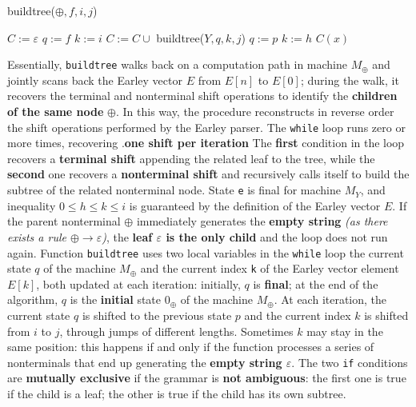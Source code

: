 \begin{algorithm}[H]
  \caption{buildtree($\oplus, f, i, j$)}
      \begin{algorithmic}[1]
          \State $C := \varepsilon$
          \State $q := f$
          \State $k := i$
              \EndIf 
                  \State $C := C \cup$ buildtree($Y, q, k, j$)
              \EndIf 
              \State $q := p$ 
              \State $k := h $
          \EndWhile
          \State \Return $C(x)$
      \end{algorithmic}
\end{algorithm}
Essentially, \texttt{buildtree} walks back on a computation path in machine $M_\oplus$ and jointly scans back the Earley vector $E$ from $E[n]$ to $E[0]$;
during the walk, it recovers the terminal and nonterminal shift operations to identify the \textbf{children of the same node} $\oplus$.
In this way, the procedure reconstructs in reverse order the shift operations performed by the Earley parser.
The \texttt{while} loop runs zero or more times, recovering .\textbf{one shift per iteration}
The \textbf{first} condition in the loop recovers a \textbf{terminal shift} appending the related leaf to the tree, while the \textbf{second} one recovers a \textbf{nonterminal shift} and recursively calls itself to build the subtree of the related nonterminal node.
State \texttt{e} is final for machine $M_Y$, and inequality $0 \leq h \leq k \leq i$ is guaranteed by the definition of the Earley vector $E$.
If the parent nonterminal $\oplus$ immediately generates the \textbf{empty string} \textit{(as there exists a rule $\oplus \rightarrow \varepsilon$)}, the \textbf{leaf $\varepsilon$ is the only child} and the loop does not run again.
Function \texttt{buildtree} uses two local variables in the \texttt{while} loop the current state $q$ of the machine $M_\oplus$ and the current index \texttt{k} of the Earley vector element $E[k]$, both updated at each iteration:
initially, $q$ is \textbf{final}; at the end of the algorithm, $q$ is the \textbf{initial} state $0_\oplus$ of the machine $M_\oplus$.
At each iteration, the current state $q$ is shifted to the previous state $p$ and the current index $k$ is shifted from $i$ to $j$, through jumps of different lengths.
Sometimes $k$ may stay in the same position: this happens if and only if the function processes a series of nonterminals that end up generating the \textbf{empty string $\varepsilon$}.
The two \texttt{if} conditions are \textbf{mutually exclusive} if the grammar is \textbf{not ambiguous}:
the first one is true if the child is a leaf; the other is true if the child has its own subtree.

